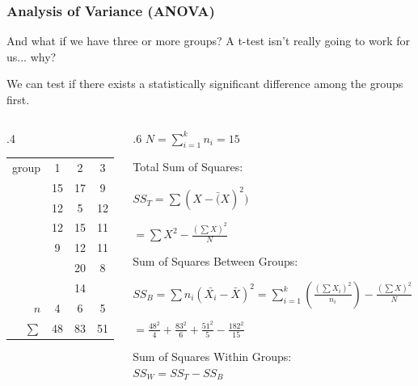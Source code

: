 \documentclass{beamer} %
\begin{document}
	\begin{frame}
		\frametitle{Analysis of Variance (ANOVA)}
		And what if we have three or more groups? A t-test isn't really going to work for us... why?

		We can test if there exists a statistically significant difference among the groups first.\vspace{.125in}

		\begin{columns}
			\begin{column}{.4\linewidth}
				\begin{tabular}{ r | c | c | c }
					group 	& 1 & 2 & 3 \\
					~ 		& 15 & 17 & 9 \\
					~ 		& 12 & 5 & 12 \\
					~ 		& 12 & 15 & 11 \\
					~ 		& 9 & 12 & 11 \\
					~ 		& ~ & 20 & 8 \\
					~ 		& ~ & 14 & ~ \\
					\midrule
					$n$ 		& 4 & 6 & 5 \\
					$\sum$ 	& 48 & 83 & 51 \\
				\end{tabular}
			\end{column}
			\begin{column}{.6\linewidth}
				$N = \sum_{i=1}^k n_i = 15$



				Total Sum of Squares:

				$SS_T = \sum(X-\bar(X)^2)$

				$ = \sum X^2 - \frac{(\sum X)^2}{N} $ \vspace{.125in} %

				Sum of Squares Between Groups:

				$SS_B = \sum n_i (\bar{X_i} - \bar{X})^2 = \sum_{i=1}^k \left( \frac{(\sum X_i)^2}{n_i}\right) - \frac{(\sum X)^2}{N}$

				$ = \frac{48^2}{4}+\frac{83^2}{6}+\frac{51^2}{5} - \frac{182^2}{15} $ \vspace{.125in} %

				Sum of Squares Within Groups:\\ $SS_W = SS_T - SS_B$%
			\end{column}
		\end{columns}
	\end{frame}
\end{document}
